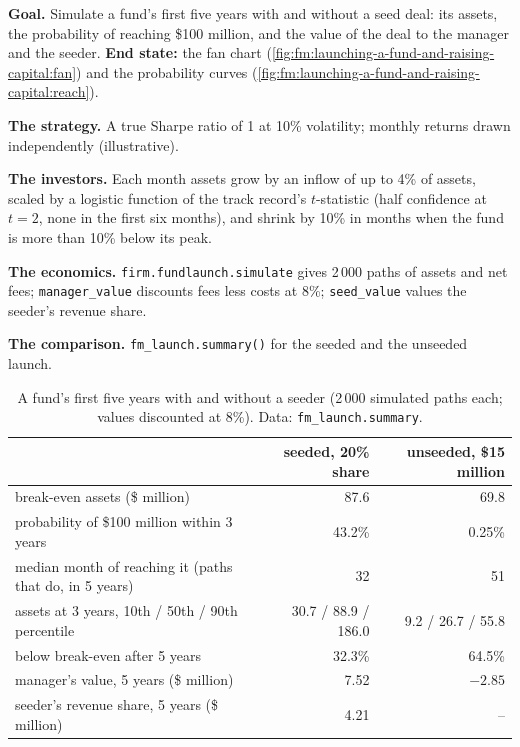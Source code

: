 \begin{tutorial}
\textbf{Goal.} Simulate a fund's first five years with and without a seed deal: its assets, the probability of reaching \$100 million, and the value
of the deal to the manager and the seeder. \textbf{End state:} the fan chart (\cref{fig:fm:launching-a-fund-and-raising-capital:fan}) and the
probability curves (\cref{fig:fm:launching-a-fund-and-raising-capital:reach}).
\begin{tutsteps}
\item \textbf{The strategy.} A true Sharpe ratio of 1 at 10\% volatility; monthly returns drawn independently (illustrative).
\item \textbf{The investors.} Each month assets grow by an inflow of up to 4\% of assets, scaled by a logistic function of the track record's
$t$-statistic (half confidence at $t=2$, none in the first six months), and shrink by 10\% in months when the fund is more than 10\% below its peak.
\item \textbf{The economics.} \texttt{firm.fundlaunch.simulate} gives 2\,000 paths of assets and net fees; \texttt{manager\_value} discounts fees
less costs at 8\%; \texttt{seed\_value} values the seeder's revenue share.
\item \textbf{The comparison.} \texttt{fm\_launch.summary()} for the seeded and the unseeded launch.
\end{tutsteps}
\end{tutorial}

\begin{table}[ht]
\centering\small
\begin{tabular}{lrr}
\toprule
 & seeded, 20\% share & unseeded, \$15 million \\
\midrule
break-even assets (\$ million) & 87.6 & 69.8 \\
probability of \$100 million within 3 years & 43.2\% & 0.25\% \\
median month of reaching it (paths that do, in 5 years) & 32 & 51 \\
assets at 3 years, 10th / 50th / 90th percentile & 30.7 / 88.9 / 186.0 & 9.2 / 26.7 / 55.8 \\
below break-even after 5 years & 32.3\% & 64.5\% \\
manager's value, 5 years (\$ million) & 7.52 & $-2.85$ \\
seeder's revenue share, 5 years (\$ million) & 4.21 & -- \\
\bottomrule
\end{tabular}
\caption{A fund's first five years with and without a seeder (2\,000 simulated paths each; values discounted at 8\%). Data:
\texttt{fm\_launch.summary}.}\label{tab:fm:launching-a-fund-and-raising-capital:cases}
\end{table}

